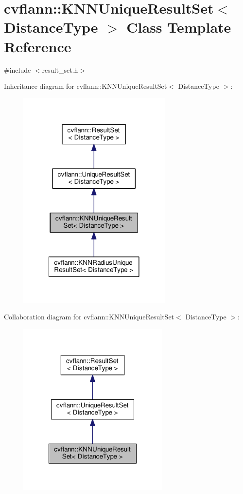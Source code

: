 \hypertarget{classcvflann_1_1KNNUniqueResultSet}{\section{cvflann\-:\-:K\-N\-N\-Unique\-Result\-Set$<$ Distance\-Type $>$ Class Template Reference}
\label{classcvflann_1_1KNNUniqueResultSet}
}


{\ttfamily \#include $<$result\-\_\-set.\-h$>$}



Inheritance diagram for cvflann\-:\-:K\-N\-N\-Unique\-Result\-Set$<$ Distance\-Type $>$\-:\nopagebreak
\begin{figure}[H]
\begin{center}
\leavevmode
\includegraphics[width=218pt]{classcvflann_1_1KNNUniqueResultSet__inherit__graph}
\end{center}
\end{figure}


Collaboration diagram for cvflann\-:\-:K\-N\-N\-Unique\-Result\-Set$<$ Distance\-Type $>$\-:\nopagebreak
\begin{figure}[H]
\begin{center}
\leavevmode
\includegraphics[width=214pt]{classcvflann_1_1KNNUniqueResultSet__coll__graph}
\end{center}
\end{figure}
